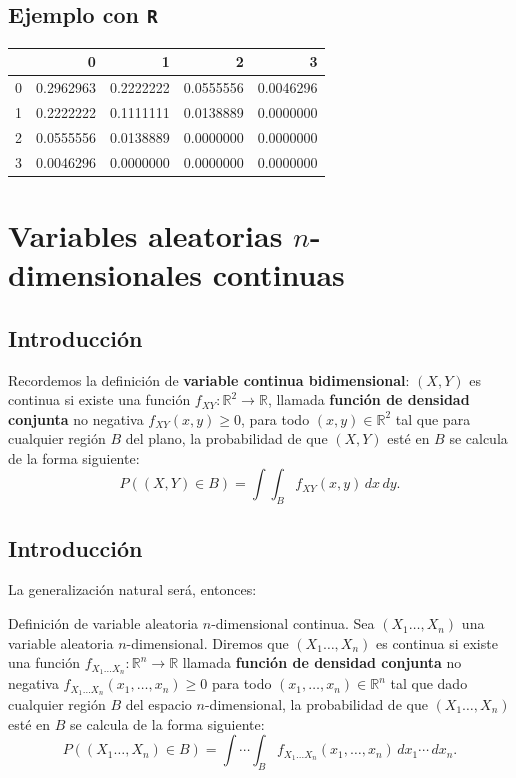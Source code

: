 \documentclass[]{book}
\begin{document}
\hypertarget{ejemplo-con-r-20}{%
\subsection{\texorpdfstring{Ejemplo con \texttt{R}}{Ejemplo con R}}\label{ejemplo-con-r-20}}

\begin{tabular}{l|r|r|r|r}
\hline
  & 0 & 1 & 2 & 3\\
\hline
0 & 0.2962963 & 0.2222222 & 0.0555556 & 0.0046296\\
\hline
1 & 0.2222222 & 0.1111111 & 0.0138889 & 0.0000000\\
\hline
2 & 0.0555556 & 0.0138889 & 0.0000000 & 0.0000000\\
\hline
3 & 0.0046296 & 0.0000000 & 0.0000000 & 0.0000000\\
\hline
\end{tabular}

\hypertarget{variables-aleatorias-n-dimensionales-continuas}{%
\section{\texorpdfstring{Variables aleatorias \(n\)-dimensionales continuas}{Variables aleatorias n-dimensionales continuas}}\label{variables-aleatorias-n-dimensionales-continuas}}

\hypertarget{introducciuxf3n-11}{%
\subsection{Introducción}\label{introducciuxf3n-11}}

Recordemos la definición de \textbf{variable continua bidimensional}: \((X,Y)\) es continua si existe una función \(f_{XY}:\mathbb{R}^2\longrightarrow \mathbb{R}\), llamada \textbf{función de densidad conjunta} no negativa \(f_{XY}(x,y)\geq 0\), para todo \((x,y)\in\mathbb{R}^2\) tal que para cualquier región \(B\) del plano, la probabilidad de que \((X,Y)\) esté en \(B\) se calcula de la forma siguiente:
\[
P((X,Y)\in B)=\int\int_B f_{XY}(x,y)\,dx\, dy.
\]

\hypertarget{introducciuxf3n-12}{%
\subsection{Introducción}\label{introducciuxf3n-12}}

La generalización natural será, entonces:

Definición de variable aleatoria \(n\)-dimensional continua.
Sea \((X_1\ldots,X_n)\) una variable aleatoria \(n\)-dimensional. Diremos que \((X_1\ldots,X_n)\) es continua si existe una función
\(f_{X_1\ldots X_n}:\mathbb{R}^n\longrightarrow \mathbb{R}\) llamada \textbf{función de densidad conjunta} no negativa \(f_{X_1\ldots X_n}(x_1,\ldots,x_n)\geq 0\) para todo \((x_1,\ldots,x_n)\in\mathbb{R}^n\) tal que dado cualquier región \(B\) del espacio \(n\)-dimensional, la probabilidad de que \((X_1\ldots,X_n)\) esté en \(B\) se calcula de la forma siguiente:
\[
P((X_1\ldots,X_n)\in B)=\int\cdots\int_B f_{X_1\ldots X_n}(x_1,\ldots,x_n)\,dx_1\cdots\,dx_n.
\]
\end{document}
